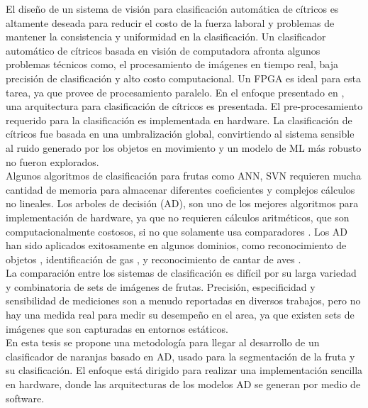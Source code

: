 \documentclass[twoside,spanish,ESP,MSc]{plantillaLabUPV}
\theoremstyle{definition}
\begin{document}



El diseño de un sistema de visión para clasificación automática de cítricos es altamente deseada para reducir el costo de la fuerza laboral y problemas de mantener la consistencia y uniformidad en la clasificación. Un clasificador automático de cítricos basada en visión de computadora afronta algunos problemas técnicos como, el procesamiento de imágenes en tiempo real, baja precisión de clasificación y alto costo computacional. Un FPGA es ideal para esta tarea, ya que provee de procesamiento paralelo.  En el enfoque presentado en \cite{josu}, una arquitectura para clasificación de cítricos es presentada. El pre-procesamiento requerido para la clasificación es implementada en hardware. La clasificación de cítricos fue basada en una umbralización global, convirtiendo al sistema sensible al ruido generado por los objetos en movimiento y un modelo de ML más robusto no fueron explorados.\\



Algunos algoritmos de clasificación para frutas como ANN, SVN requieren mucha cantidad de memoria para almacenar diferentes coeficientes y complejos cálculos no lineales. Los arboles de decisión (AD), son uno de los mejores algoritmos para implementación de hardware, ya que no requieren cálculos aritméticos, que son computacionalmente costosos, si no que solamente usa comparadores \cite{6636881}. Los AD han sido aplicados exitosamente en algunos dominios, como reconocimiento de objetos \cite{10.1007/978-3-540-32256-6_52}, identificación de gas \cite{li}, y reconocimiento de cantar de aves \cite{5986215}.\\



La comparación entre los sistemas de clasificación es difícil por su larga variedad y combinatoria de sets de imágenes de frutas. Precisión, especificidad y sensibilidad de mediciones son a menudo reportadas en diversos trabajos, pero no hay una medida real para medir su desempeño en el area, ya que existen sets de imágenes que son capturadas en entornos estáticos.\\

En esta tesis se propone una metodología para llegar al desarrollo de un clasificador de naranjas basado en AD, usado para la segmentación de la fruta y su clasificación. El enfoque está dirigido para realizar una implementación sencilla en hardware, donde las arquitecturas de los modelos AD se generan por medio de software.
\end{document}
